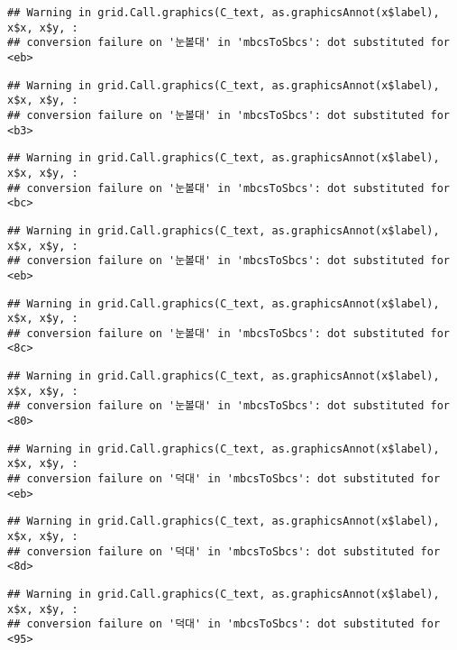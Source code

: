 \documentclass[
]{article}
\begin{document}
\begin{verbatim}
## Warning in grid.Call.graphics(C_text, as.graphicsAnnot(x$label), x$x, x$y, :
## conversion failure on '눈볼대' in 'mbcsToSbcs': dot substituted for <eb>
\end{verbatim}

\begin{verbatim}
## Warning in grid.Call.graphics(C_text, as.graphicsAnnot(x$label), x$x, x$y, :
## conversion failure on '눈볼대' in 'mbcsToSbcs': dot substituted for <b3>
\end{verbatim}

\begin{verbatim}
## Warning in grid.Call.graphics(C_text, as.graphicsAnnot(x$label), x$x, x$y, :
## conversion failure on '눈볼대' in 'mbcsToSbcs': dot substituted for <bc>
\end{verbatim}

\begin{verbatim}
## Warning in grid.Call.graphics(C_text, as.graphicsAnnot(x$label), x$x, x$y, :
## conversion failure on '눈볼대' in 'mbcsToSbcs': dot substituted for <eb>
\end{verbatim}

\begin{verbatim}
## Warning in grid.Call.graphics(C_text, as.graphicsAnnot(x$label), x$x, x$y, :
## conversion failure on '눈볼대' in 'mbcsToSbcs': dot substituted for <8c>
\end{verbatim}

\begin{verbatim}
## Warning in grid.Call.graphics(C_text, as.graphicsAnnot(x$label), x$x, x$y, :
## conversion failure on '눈볼대' in 'mbcsToSbcs': dot substituted for <80>
\end{verbatim}

\begin{verbatim}
## Warning in grid.Call.graphics(C_text, as.graphicsAnnot(x$label), x$x, x$y, :
## conversion failure on '덕대' in 'mbcsToSbcs': dot substituted for <eb>
\end{verbatim}

\begin{verbatim}
## Warning in grid.Call.graphics(C_text, as.graphicsAnnot(x$label), x$x, x$y, :
## conversion failure on '덕대' in 'mbcsToSbcs': dot substituted for <8d>
\end{verbatim}

\begin{verbatim}
## Warning in grid.Call.graphics(C_text, as.graphicsAnnot(x$label), x$x, x$y, :
## conversion failure on '덕대' in 'mbcsToSbcs': dot substituted for <95>
\end{verbatim}
\end{document}

